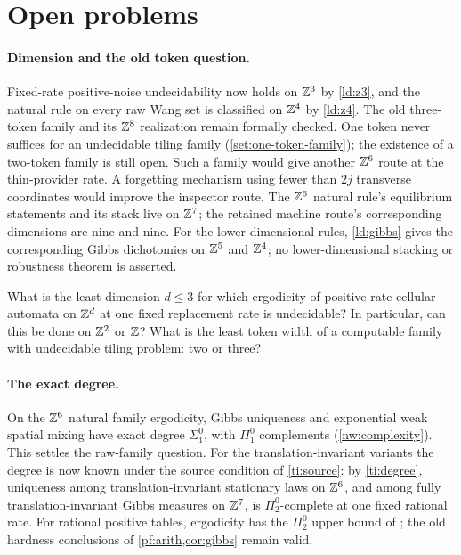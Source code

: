 \section{Open problems}\label{sec:discussion}

\paragraph{Dimension and the old token question.}
Fixed-rate positive-noise undecidability now holds on $\mathbb{Z}^3$ by \cref{ld:z3}, and the natural rule on every raw Wang set is classified on $\mathbb{Z}^4$ by \cref{ld:z4}. The old three-token family and its $\mathbb{Z}^8$ realization remain formally checked. One token never suffices for an undecidable tiling family (\cref{set:one-token-family}); the existence of a two-token family is still open. Such a family would give another $\mathbb{Z}^6$ route at the thin-provider rate. A forgetting mechanism using fewer than $2j$ transverse coordinates would improve the inspector route. The $\mathbb{Z}^6$ natural rule's equilibrium statements and its stack live on $\mathbb{Z}^7$; the retained machine route's corresponding dimensions are nine and nine. For the lower-dimensional rules, \cref{ld:gibbs} gives the corresponding Gibbs dichotomies on $\mathbb{Z}^5$ and $\mathbb{Z}^4$; no lower-dimensional stacking or robustness theorem is asserted.

\begin{problem}\label{prob:dimension}
What is the least dimension $d\le3$ for which ergodicity of positive-rate cellular automata on $\mathbb{Z}^d$ at one fixed replacement rate is undecidable? In particular, can this be done on $\mathbb{Z}^2$ or $\mathbb{Z}$? What is the least token width of a computable family with undecidable tiling problem: two or three?
\end{problem}

\paragraph{The exact degree.}
On the $\mathbb{Z}^6$ natural family ergodicity, Gibbs uniqueness and exponential weak spatial mixing have exact degree $\Sigma^0_1$, with $\Pi^0_1$ complements (\cref{nw:complexity}). This settles the raw-family question. For the translation-invariant variants the degree is now known under the source condition of \cref{ti:source}: by \cref{ti:degree}, uniqueness among translation-invariant stationary laws on $\mathbb{Z}^6$, and among fully translation-invariant Gibbs measures on $\mathbb{Z}^7$, is $\Pi^0_2$-complete at one fixed rational rate. For rational positive tables, ergodicity has the $\Pi^0_2$ upper bound of \cite[Remark~10.9]{DM26}; the old hardness conclusions of \cref{pf:arith,cor:gibbs} remain valid.


